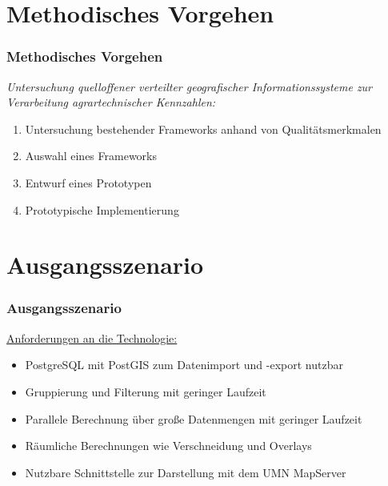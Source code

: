 \documentclass{beamer}
\begin{document}
\section{Methodisches Vorgehen}

\begin{frame}\frametitle{Methodisches Vorgehen}
\textit{Untersuchung quelloffener verteilter geografischer Informationssysteme zur Verarbeitung agrartechnischer Kennzahlen:}\\
\begin{enumerate} %
\item Untersuchung bestehender Frameworks anhand von Qualitätsmerkmalen
\item Auswahl eines Frameworks
\item Entwurf eines Prototypen %
\item Prototypische Implementierung %
\end{enumerate}
\end{frame}

\section{Ausgangsszenario}

\begin{frame}\frametitle{Ausgangsszenario}
\underline{Anforderungen an die Technologie:}
\begin{itemize}
\item PostgreSQL mit PostGIS zum Datenimport und -export nutzbar
\item Gruppierung und Filterung mit geringer Laufzeit
\item Parallele Berechnung über große Datenmengen mit geringer Laufzeit
\item Räumliche Berechnungen wie Verschneidung und Overlays
\item Nutzbare Schnittstelle zur Darstellung mit dem UMN MapServer
\end{itemize}
\end{frame}
\end{document}
